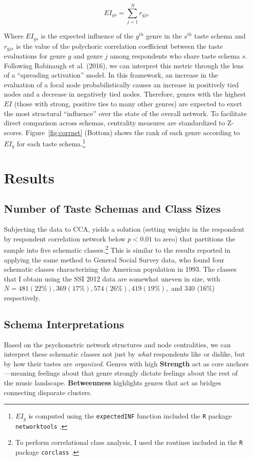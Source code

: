 \documentclass[preprint, authoryear,11pt, 3p]{elsarticle}
\begin{document}
\begin{equation}
EI_{gs} = \sum_{j=1}^{N} r_{gjs}    
\end{equation}

Where $EI_{gs}$ is the expected influence of the $g^{th}$ genre in the $s^{th}$ taste schema and $r_{gjs}$ is the value of the polychoric correlation coefficient between the taste evaluations for genre $g$ and genre $j$ among respondents who share taste schema $s$. Following Robinaugh et al. (2016), we can interpret this metric through the lens of a ``spreading activation'' model. In this framework, an increase in the evaluation of a focal node probabilistically causes an increase in positively tied nodes and a decrease in negatively tied nodes. Therefore, genres with the highest $EI$ (those with strong, positive ties to many other genres) are expected to exert the most structural ``influence'' over the state of the overall network. To facilitate direct comparison across schemas, centrality measures are standardized to Z-scores. Figure~\ref{fig:corrnet} (Bottom) shows the rank of each genre according to $EI_g$ for each taste schema.\footnote{$EI_g$ is computed using the \texttt{expectedINF} function included the \texttt{R} package \texttt{networktools} \citep{networktools}.}

\section{Results}
\subsection{Number of Taste Schemas and Class Sizes} 
Subjecting the data to CCA, yields a solution (setting weights in the respondent by respondent correlation network below $p<0.01$ to zero) that partitions the sample into five schematic classes.\footnote{To perform correlational class analysis, I used the routines included in the \texttt{R} package \texttt{corclass} \citep{corclass}.} This is similar to the results reported in \citet{boutyline2017improving} applying the same method to General Social Survey data, who found four schematic classes characterizing the American population in 1993. The classes that I obtain using the SSI 2012 data are somewhat uneven in size, with $N = 481 (22\%), 369 (17\%), 574 (26\%), 419 (19\%),$ and 340 (16\%) respectively. 
      
\subsection{Schema Interpretations}
Based on the psychometric network structures and node centralities, we can interpret these schematic classes not just by \emph{what} respondents like or dislike, but by how their tastes are \emph{organized}. Genres with high \textbf{Strength} act as core anchors---meaning feelings about that genre strongly dictate feelings about the rest of the music landscape. \textbf{Betweenness} highlights genres that act as bridges connecting disparate clusters.
\end{document}
